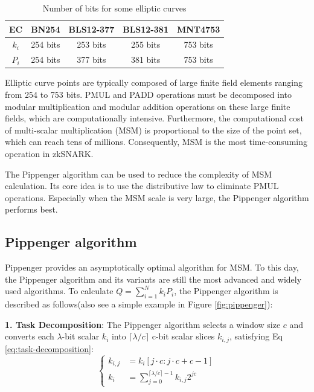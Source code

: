 \documentclass[conference]{IEEEtran}
\begin{document}
\begin{table}[htbp]
    \label{tab:elliptic-curves-bits}
    \centering
    \caption{Number of bits for some elliptic curves}
    \begin{tabular}{c|c|c|c|c}
    \toprule
    \textbf{EC} & \textbf{BN254} & \textbf{BLS12-377} & \textbf{BLS12-381} & \textbf{MNT4753} \\
    \midrule
    $k_i$ & 254 bits & 253 bits & 255 bits & 753 bits \\
    $P_i$ & 254 bits & 377 bits & 381 bits & 753 bits \\
    \bottomrule
    \end{tabular}
    \label{tab:elliptic-curves-bits}
\end{table}

Elliptic curve points are typically composed of large finite field elements ranging from 254 to 753 bits. PMUL and PADD operations must be decomposed into modular multiplication and modular addition operations on these large finite fields, which are computationally intensive. Furthermore, the computational cost of multi-scalar multiplication (MSM) is proportional to the size of the point set, which can reach tens of millions. Consequently, MSM is the most time-consuming operation in zkSNARK.

The Pippenger algorithm can be used to reduce the complexity of MSM calculation. Its core idea is to use the distributive law to eliminate PMUL operations. Especially when the MSM scale is very large, the Pippenger algorithm performs best.

\subsection{Pippenger algorithm}
Pippenger provides an asymptotically optimal algorithm for MSM. To this day, the Pippenger algorithm and its variants are still the most advanced and widely used algorithms. To calculate $Q=\sum_{i=1}^N k_i P_i$, the Pippenger algorithm is described as follows(also see a simple example in Figure \ref{fig:pippenger}):

\textbf{1. Task Decomposition}: The Pippenger algorithm selects a window size $c$ and converts each $\lambda$-bit scalar $k_i$ into $\lceil \lambda / c \rceil$ c-bit scalar slices $k_{i,j}$, satisfying Eq \eqref{eq:task-decomposition}:
\begin{equation}
\label{eq:task-decomposition}
\left\{
\begin{aligned}
k_{i,j} &= k_i[j \cdot c : j \cdot c + c - 1] \\
k_i &= \sum_{j=0}^{\lceil \lambda / c \rceil - 1} k_{i,j} 2^{j c}
\end{aligned}
\right.
\end{equation}
\end{document}
